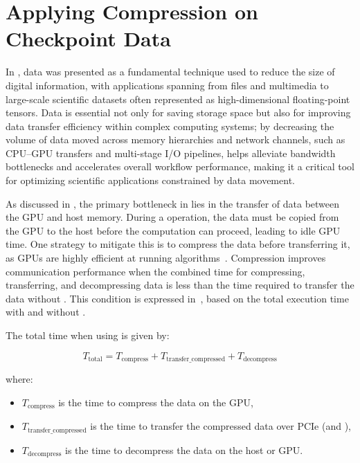 \documentclass[Ingles,Final]{ic-tese-v3}
\begin{document}
\chapter{Applying Compression on Checkpoint Data}
\label{ch:compress}

In , data \compression was presented as a fundamental technique used to reduce the size of digital information, with applications spanning from files and multimedia to large-scale scientific datasets often represented as high-dimensional floating-point tensors. Data \compression is essential not only for saving storage space but also for improving data transfer efficiency within complex computing systems; by decreasing the volume of data moved across memory hierarchies and network channels, such as CPU–GPU transfers and multi-stage I/O pipelines, \compression helps alleviate bandwidth bottlenecks and accelerates overall workflow performance, making it a critical tool for optimizing scientific applications constrained by data movement.

As discussed in , the primary bottleneck in \awave lies in the transfer of \checkpointing data between the GPU and host memory. During a \save operation, the data must be copied from the GPU to the host before the computation can proceed, leading to idle GPU time. One strategy to mitigate this is to compress the data before transferring it, as GPUs are highly efficient at running \compression algorithms~\cite{dmitriev2022}. Compression improves communication performance when the combined time for compressing, transferring, and decompressing data is less than the time required to transfer the data without \compression. This condition is expressed in~, based on the total execution time with and without \compression.

The total time when using \compression is given by:

\begin{equation}
T_{\text{total}} = T_{\text{compress}} + T_{\text{transfer\_compressed}} + T_{\text{decompress}}
\label{eq:ttotal}
\end{equation}

\noindent where:
\begin{itemize}
    \item \( T_{\text{compress}} \) is the time to compress the data on the GPU,
    \item \( T_{\text{transfer\_compressed}} \) is the time to transfer the compressed data over PCIe (\dth and \htd),
    \item \( T_{\text{decompress}} \) is the time to decompress the data on the host or GPU.
\end{itemize}
\end{document}
